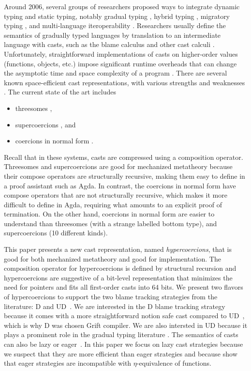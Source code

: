 \documentclass[acmsmall,review,anonymous]{acmart}\settopmatter{printfolios=true,printccs=false,printacmref=false}
\begin{document}
Around 2006, several groups of researchers proposed ways to integrate
dynamic typing and static typing, notably gradual typing
\citep{siek2006gradual}, hybrid typing \citep{flanagan2006hybrid},
migratory typing \citep{Tobin-Hochstadt:2006fk}, and multi-language
iteroperability \citep{Gray:2005ij,Matthews:2007zr}. Researchers
usually define the semantics of gradually typed languages by
translation to an intermediate language with casts, such as the blame
calculus \citep{wadler2009well} and other cast calculi
\citep{siek2009exploring}. Unfortunately, straightforward
implementations of casts on higher-order values (functions, objects,
etc.) impose significant runtime overheads that can change the
asymptotic time and space complexity of a program
\citep{herman2010space}. There are several known space-efficient cast
representations, with various strengths and weaknesses
\citep{siek2015blame,siek2010threesomes,garcia2013calculating,kuhlenschmidt2018efficient,siek2012interpretations,garcia2014deriving}.
The current state of the art includes

\begin{itemize}
\item threesomes \citep{siek2010threesomes,garcia2013calculating},
\item supercoercions \citep{garcia2013calculating}, and
\item coercions in normal form
  \citep{siek2012interpretations,siek2015blame}.
\end{itemize}
Recall that in these systems, casts are compressed using a composition
operator.  Threesomes and supercoercions are good for mechanized
metatheory because their compose operators are structurally recursive,
making them easy to define in a proof assistant such as Agda. In
contrast, the coercions in normal form have compose operators that are
not structurally recursive, which makes it more difficult to define in
Agda, requiring what amounts to an explicit proof of termination.
%
On the other hand, coercions in normal form are easier to understand
than threesomes (with a strange labelled bottom type), and
supercoercions (10 different kinds).

This paper presents a new cast representation, named
\emph{hypercoercions}, that is good for both mechanized metatheory and
good for implementation. The composition operator for hypercoercions
is defined by structural recursion and hypercoercions are suggestive
of a bit-level representation that minimizes the need for pointers and
fits all first-order casts into 64 bits. We present two flavors of
hypercoercions to support the two blame tracking strategies from the
literature: D and UD~\citep{siek2009exploring}. We are interested in
the D blame tracking strategy because it comes with a more
straightforward notion safe cast compared to
UD~\citep{siek2009exploring}, which is why D was chosen Grift
compiler. We are also intersted in UD because it plays a prominent
role in the gradual typing literature \citep{wadler2009well}. The
semantics of casts can also be lazy or
eager~\citep{siek2009exploring}. In this paper we focus on lazy cast
strategies because we suspect that they are more efficient than eager
strategies and because \citet{new2019gradual} show that eager
strategies are incompatible with $\eta$-equivalence of functions.
\end{document}
